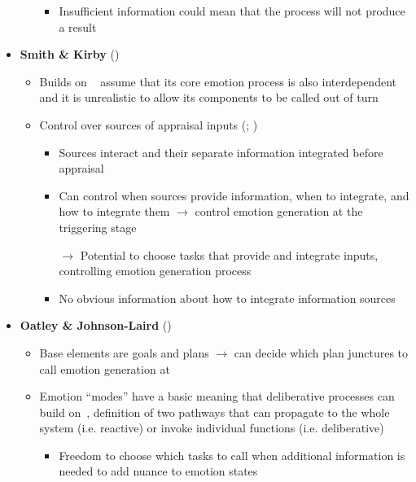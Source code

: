 \begin{itemize}
\begin{itemize}
\begin{itemize}
            \item Insufficient information could mean that the process will not
            produce a result
        \end{itemize}
    \end{itemize}

    \item \textbf{Smith \& Kirby} (\good)
    \begin{itemize}
        \item Builds on \cite{smith1990emotion}~\citep[p.~122]{smith2001toward}
        \wasytherefore{} assume that its core emotion process is also
        interdependent and it is unrealistic to allow its components to be
        called out of turn

        \item Control over sources of appraisal inputs (\citep[p.~93--94,
        100]{smith2000consequences}; )
        \begin{itemize}
            \item Sources interact and their separate information integrated
            before appraisal

            \item Can control when sources provide information, when to
            integrate, and how to integrate them $\rightarrow$ control emotion
            generation at the triggering stage

            \item [$\rightarrow$] Potential to choose tasks that provide and
            integrate inputs, controlling emotion generation process

            \item No obvious information about how to integrate information
            sources
        \end{itemize}
    \end{itemize}

    \item \textbf{Oatley \& Johnson-Laird} (\good)
    \begin{itemize}
        \item Base elements are goals and plans $\rightarrow$ can decide which
        plan junctures to call emotion generation at

        \item Emotion ``modes'' have a basic meaning that deliberative
        processes can build on~\citep[p.~35, 43]{oatley1987towards}, definition
        of two pathways that can propagate to the whole system (i.e. reactive)
        or invoke individual functions (i.e.
        deliberative)~\citep[p.~32--34]{oatley1987towards}
        \begin{itemize}
            \item Freedom to choose which tasks to call when additional
            information is needed to add nuance to emotion states


\end{itemize}
\end{itemize}
\end{itemize}
